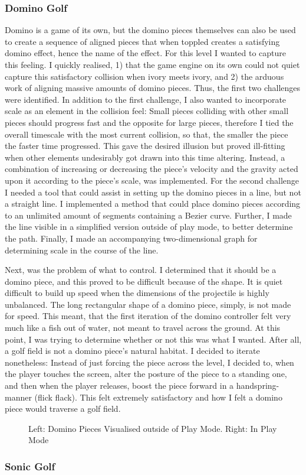 \subsubsection{Domino Golf}
Domino is a game of its own, but the domino pieces themselves can also be used to create a sequence of aligned pieces that when toppled creates a satisfying domino effect, hence the name of the effect. For this level I wanted to capture this feeling. I quickly realised, 1) that the game engine on its own could not quiet capture this satisfactory collision when ivory meets ivory, and 2) the arduous work of aligning massive amounts of domino pieces. Thus, the first two challenges were identified. In addition to the first challenge, I also wanted to incorporate scale as an element in the collision feel: Small pieces colliding with other small pieces should progress fast and the opposite for large pieces, therefore I tied the overall timescale with the most current collision, so that, the smaller the piece the faster time progressed. This gave the desired illusion but proved ill-fitting when other elements undesirably got drawn into this time altering. Instead, a combination of increasing or decreasing the piece's velocity and the gravity acted upon it according to the piece's scale, was implemented. For the second challenge I needed a tool that could assist in setting up the domino pieces in a line, but not a straight line. I implemented a method that could place domino pieces according to an unlimited amount of segments containing a Bezier curve. Further, I made the line visible in a simplified version outside of play mode, to better determine the path. Finally, I made an accompanying two-dimensional graph for determining scale in the course of the line.

Next, was the problem of what to control. I determined that it should be a domino piece, and this proved to be difficult because of the shape. It is quiet difficult to build up speed when the dimensions of the projectile is highly unbalanced. The long rectangular shape of a domino piece, simply, is not made for speed. This meant, that the first iteration of the domino controller felt very much like a fish out of water, not meant to travel across the ground. At this point, I was trying to determine whether or not this was what I wanted. After all, a golf field is not a domino piece's natural habitat. I decided to iterate nonetheless: Instead of just forcing the piece across the level, I decided to, when the player touches the screen, alter the posture of the piece to a standing one, and then when the player releases, boost the piece forward in a handspring-manner (flick flack). This felt extremely satisfactory and how I felt a domino piece would traverse a golf field.
\begin{center}
  \begin{figure}[!htb]
    \noindent{}
    \caption{Left: Domino Pieces Visualised outside of Play Mode. Right: In Play Mode}
    \label{Domino}
  \end{figure}
\end{center}
\subsubsection{Sonic Golf}
